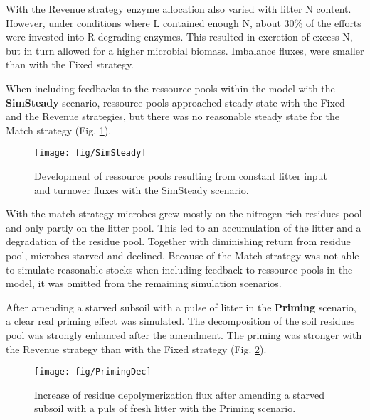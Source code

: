 With the Revenue strategy enzyme allocation also varied with litter N content.
However, under conditions where L contained enough N, about 30\% of the efforts
were invested into R degrading enzymes. This resulted in excretion of
excess N, but in turn allowed for a higher microbial biomass. Imbalance fluxes,
were smaller than with the Fixed strategy.

When including feedbacks to the ressource pools within the model with the
\textbf{SimSteady} scenario, ressource pools approached steady state with the
Fixed and the Revenue strategies, but there was no reasonable steady state for
the Match strategy (Fig. \ref{fig:SimSteady}).

\begin{figure}[t]
\vspace*{2mm}
\begin{center}
\texttt{[image: fig/SimSteady]}
\end{center}
\caption{Development of ressource pools resulting from constant litter input and
turnover fluxes with the SimSteady scenario.
\label{fig:SimSteady}}
\end{figure}

With the match strategy microbes grew mostly on the
nitrogen rich residues pool and only partly on the litter pool. This led to an
accumulation of the litter and a degradation of the residue pool. Together with
diminishing return from residue pool, microbes starved and declined.
Because of the Match strategy was not able to simulate reasonable
stocks when including feedback to ressource pools in the model, it was omitted
from the remaining simulation scenarios.

After amending a starved subsoil with a pulse of litter in the
\textbf{Priming} scenario, a clear real priming effect was simulated. The
decomposition of the soil residues pool was strongly enhanced after the
amendment. The priming was stronger with the Revenue strategy than with the
Fixed strategy (Fig. \ref{fig:PrimingDec}). 

\begin{figure}[t]
\vspace*{2mm}
\begin{center}
\texttt{[image: fig/PrimingDec]}
\end{center}
\caption{Increase of residue depolymerization flux after amending a starved
subsoil with a puls of fresh litter with the Priming scenario.
\label{fig:PrimingDec}}
\end{figure}


